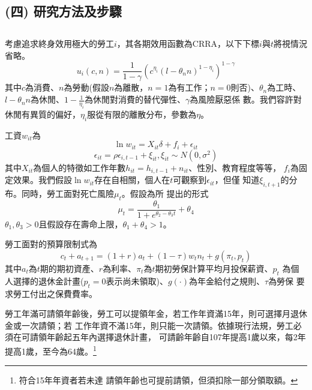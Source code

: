 \documentclass[12pt]{article}
\begin{document}
\begin{CJK*}{UTF8}{bkai}
\section*{\normalfont(四) 研究方法及步驟}

\subsection*{}
考慮追求終身效用極大的勞工$i$，其各期效用函數為CRRA，以下下標$i$與$t$將視情況省略。
\begin{equation}
    u_i(c,n) = \frac{1}{1-\gamma}(c^{\eta_i} (l-\theta_n n)^{1-\eta_i})^{1-\gamma}
\end{equation}
其中$c$為消費、$n$為勞動(假設$n$為離散，$n=1$為有工作；$n=0$則否)、$\theta_n$為工時、
$l-\theta_n n$為休閒、$1-\frac{1}{\eta_i}$為休閒對消費的替代彈性、$\gamma$為風險厭惡係
數。我們容許對休閒有異質的偏好，$\eta_i$服從有限的離散分布，參數為$\eta$。

工資$w_{it}$為
\begin{equation}
    \ln w_{it} = X_{it}\delta + f_i + \epsilon_{it}
\end{equation}
\begin{equation}
    \epsilon_{it} = \rho \epsilon_{i,t-1} + \xi_{it}, \xi_{it} \sim N(0,\sigma^2)
\end{equation}
其中$X_{it}$為個人的特徵如工作年數$h_{it}=h_{i,t-1} + n_{it}$、性別、教育程度等等，
$f_i$為固定效果。我們假設$\ln w_{it}$存在自相關，個人在$t$可觀察到$\epsilon_{it}$，但僅
知道$\xi_{i,t+1}$的分布。同時，勞工面對死亡風險$\mu_t$。假設為\cite{thatcher1999}所
提出的形式
\begin{equation}
    \mu_t = \frac{\theta_1}{1+ e^{\theta_2 - \theta_3 t}} + \theta_4
\end{equation}
$\theta_1,\theta_3 > 0$且假設存在壽命上限，$\theta_1+\theta_4 > 1$。

勞工面對的預算限制式為
\begin{equation}
    c_t + a_{t+1} = (1+r)a_t + (1-\tau) w_t n_t + g(\pi_t,p_t)
\end{equation}
其中$a_t$為$t$期的期初資產、$r$為利率、$\pi_t$為$t$期初勞保計算平均月投保薪資、$p_t$
為個人選擇的退休金計畫($p_t=0$表示尚未領取)、$g(\cdot)$為年金給付之規則、$\tau$為勞保
要求勞工付出之保費費率。

勞工年滿可請領年齡後，勞工可以提領年金，若工作年資滿15年，則可選擇月退休金或一次請領；若
工作年資不滿15年，則只能一次請領。依據現行法規，勞工必須在可請領年齡起五年內選擇退休計畫，
可請齡年齡自107年提高1歲以來，每2年提高1歲，至今為64歲。\footnote{符合15年年資者若未達
請領年齡也可提前請領，但須扣除一部分領取額。}


\end{CJK*}
\end{document}
